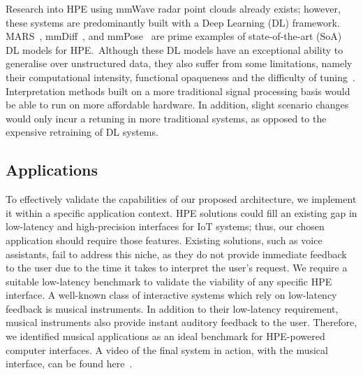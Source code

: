 Research into HPE using mmWave radar point clouds already exists; however, these systems are predominantly built with a Deep Learning (DL) framework.
MARS~\cite{an2021mars}, mmDiff~\cite{junqiao2025diffusion}, and mmPose~\cite{sengupta2020mmpose} are prime examples of state-of-the-art (SoA) DL models for HPE.\,
Although these DL models have an exceptional ability to generalise over unstructured data, they also suffer from some limitations, namely their computational intensity, functional opaqueness and the difficulty of tuning~\cite{chris2024deep, hussain2019deep}.
Interpretation methods built on a more traditional signal processing basis would be able to run on more affordable hardware.
In addition, slight scenario changes would only incur a retuning in more traditional systems, as opposed to the expensive retraining of DL systems.

\subsection*{Applications}
To effectively validate the capabilities of our proposed architecture, we implement it within a specific application context.
HPE solutions could fill an existing gap in low-latency and high-precision interfaces for IoT systems; thus, our chosen application should require those features.
Existing solutions, such as voice assistants, fail to address this niche, as they do not provide immediate feedback to the user due to the time it takes to interpret the user's request.
We require a suitable low-latency benchmark to validate the viability of any specific HPE interface.
A well-known class of interactive systems which rely on low-latency feedback is musical instruments.
In addition to their low-latency requirement, musical instruments also provide instant auditory feedback to the user.
Therefore, we identified musical applications as an ideal benchmark for HPE-powered computer interfaces.
A video of the final system in action, with the musical interface, can be found here~\cite{usage_video}.



